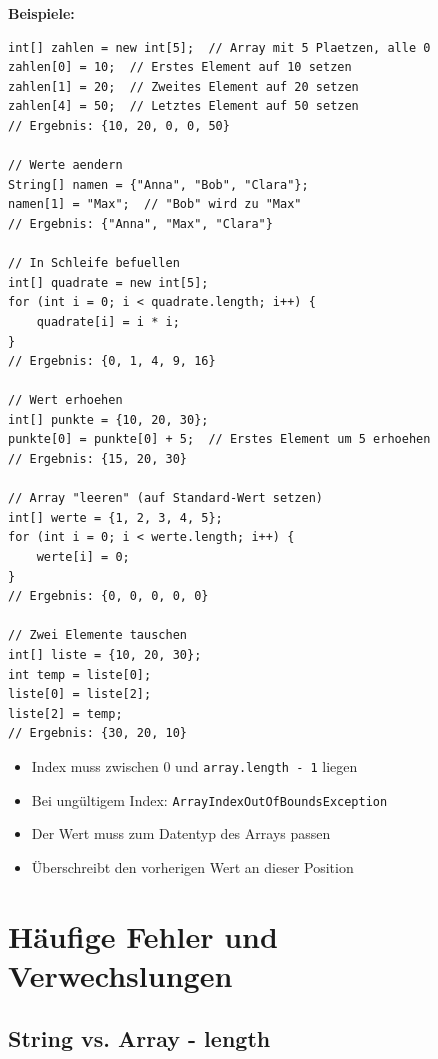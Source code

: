 \textbf{Beispiele:}
\begin{lstlisting}
int[] zahlen = new int[5];  // Array mit 5 Plaetzen, alle 0
zahlen[0] = 10;  // Erstes Element auf 10 setzen
zahlen[1] = 20;  // Zweites Element auf 20 setzen
zahlen[4] = 50;  // Letztes Element auf 50 setzen
// Ergebnis: {10, 20, 0, 0, 50}

// Werte aendern
String[] namen = {"Anna", "Bob", "Clara"};
namen[1] = "Max";  // "Bob" wird zu "Max"
// Ergebnis: {"Anna", "Max", "Clara"}

// In Schleife befuellen
int[] quadrate = new int[5];
for (int i = 0; i < quadrate.length; i++) {
    quadrate[i] = i * i;
}
// Ergebnis: {0, 1, 4, 9, 16}

// Wert erhoehen
int[] punkte = {10, 20, 30};
punkte[0] = punkte[0] + 5;  // Erstes Element um 5 erhoehen
// Ergebnis: {15, 20, 30}

// Array "leeren" (auf Standard-Wert setzen)
int[] werte = {1, 2, 3, 4, 5};
for (int i = 0; i < werte.length; i++) {
    werte[i] = 0;
}
// Ergebnis: {0, 0, 0, 0, 0}

// Zwei Elemente tauschen
int[] liste = {10, 20, 30};
int temp = liste[0];
liste[0] = liste[2];
liste[2] = temp;
// Ergebnis: {30, 20, 10}
\end{lstlisting}

\begin{achtung}
	\begin{itemize}
		\item Index muss zwischen 0 und \texttt{array.length - 1} liegen
		\item Bei ungültigem Index: \texttt{ArrayIndexOutOfBoundsException}
		\item Der Wert muss zum Datentyp des Arrays passen
		\item Überschreibt den vorherigen Wert an dieser Position
	\end{itemize}
\end{achtung}

\newpage


\section*{Häufige Fehler und Verwechslungen}

\subsection*{String vs. Array - length}

